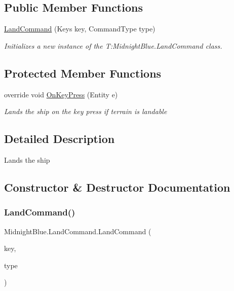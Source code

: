 \subsection*{Public Member Functions}
\begin{DoxyCompactItemize}
\item 
\hyperlink{class_midnight_blue_1_1_land_command_a936907822e22547099ec5267628fd457}{Land\+Command} (Keys key, Command\+Type type)
\begin{DoxyCompactList}\small\item\em Initializes a new instance of the T\+:\+Midnight\+Blue.\+Land\+Command class. \end{DoxyCompactList}\end{DoxyCompactItemize}
\subsection*{Protected Member Functions}
\begin{DoxyCompactItemize}
\item 
override void \hyperlink{class_midnight_blue_1_1_land_command_a2c496d96aed4498bb3ca133fcea4b172}{On\+Key\+Press} (Entity e)
\begin{DoxyCompactList}\small\item\em Lands the ship on the key press if terrain is landable \end{DoxyCompactList}\end{DoxyCompactItemize}


\subsection{Detailed Description}
Lands the ship 



\subsection{Constructor \& Destructor Documentation}
\hypertarget{class_midnight_blue_1_1_land_command_a936907822e22547099ec5267628fd457}{}\label{class_midnight_blue_1_1_land_command_a936907822e22547099ec5267628fd457} 
\subsubsection{\texorpdfstring{Land\+Command()}{LandCommand()}}
{\footnotesize\ttfamily Midnight\+Blue.\+Land\+Command.\+Land\+Command (\begin{DoxyParamCaption}\item[{Keys}]{key,  }\item[{Command\+Type}]{type }\end{DoxyParamCaption})\hspace{0.3cm}{\ttfamily [inline]}}



